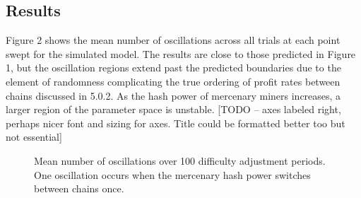 \documentclass[10pt, preprint]{aastex}
\begin{document}
\subsection{Results}
Figure 2 shows the mean number of oscillations across all trials at each point swept for the simulated model.  The results are close to those predicted in Figure 1, but the oscillation regions extend past the predicted boundaries due to the element of randomness complicating the true ordering of profit rates between chains discussed in 5.0.2.  As the hash power of mercenary miners increases, a larger region of the parameter space is unstable.
[TODO -- axes labeled right, perhaps nicer font and sizing for axes.  Title could be formatted better too but not essential]
\begin{figure}
	\centering
	\qquad
	\qquad
	\qquad
	\qquad
	\caption{Mean number of oscillations over 100 difficulty adjustment periods.  One oscillation occurs when the mercenary hash power switches between chains once.}
\end{figure}
\end{document}
